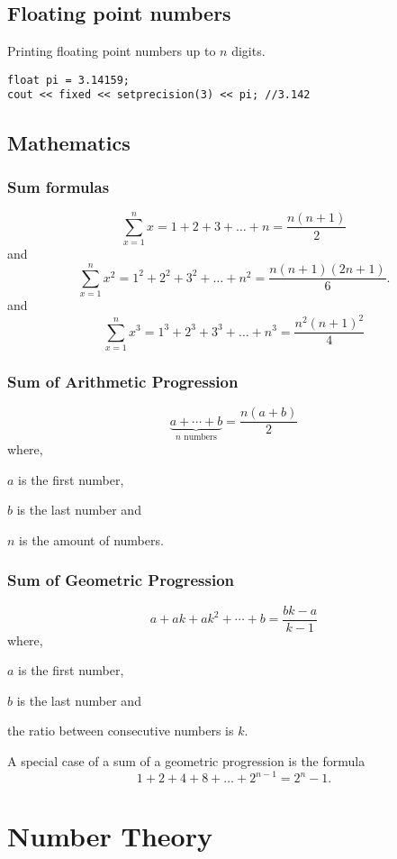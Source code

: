 \documentclass[twoside,12pt,a4paper,english]{book}
\theoremstyle{definition}
\theoremstyle{problemstyle}
\begin{document}
\section{Floating point numbers}

Printing floating point numbers up to $n$ digits.

\begin{lstlisting}
float pi = 3.14159;
cout << fixed << setprecision(3) << pi; //3.142
\end{lstlisting}


\section{Mathematics}

\subsection{Sum formulas}

\[\sum_{x=1}^n x = 1+2+3+\ldots+n = \frac{n(n+1)}{2}\]
and
\[\sum_{x=1}^n x^2 = 1^2+2^2+3^2+\ldots+n^2 = \frac{n(n+1)(2n+1)}{6}.\]
and
\[\sum_{x=1}^n x^3 = 1^3+2^3+3^3+\ldots+n^3 = \frac{n^2(n+1)^2}{4}\]

\subsection{Sum of Arithmetic Progression}

\[\underbrace{a + \cdots + b}_{n \,\, \textrm{numbers}} = \frac{n(a+b)}{2}\]
where,

$a$ is the first number,

$b$ is the last number and

$n$ is the amount of numbers.

\subsection{Sum of Geometric Progression}
\[a + ak + ak^2 + \cdots + b = \frac{bk-a}{k-1}\]
where,

$a$ is the first number,

$b$ is the last number and

the ratio between consecutive numbers is $k$.

A special case of a sum of a geometric progression is the formula
\[1+2+4+8+\ldots+2^{n-1}=2^n-1.\]

\chapter{Number Theory}
\end{document}

